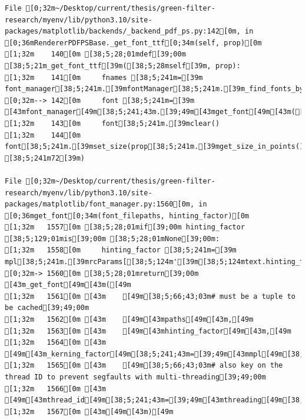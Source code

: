 \documentclass[
  letterpaper,
  DIV=11,
  numbers=noendperiod]{scrartcl}
\begin{document}
\begin{verbatim}
File [0;32m~/Desktop/current/thesis/green-filter-research/myenv/lib/python3.10/site-packages/matplotlib/backends/_backend_pdf_ps.py:142[0m, in [0;36mRendererPDFPSBase._get_font_ttf[0;34m(self, prop)[0m
[1;32m    140[0m [38;5;28;01mdef[39;00m [38;5;21m_get_font_ttf[39m([38;5;28mself[39m, prop):
[1;32m    141[0m     fnames [38;5;241m=[39m font_manager[38;5;241m.[39mfontManager[38;5;241m.[39m_find_fonts_by_props(prop)
[0;32m--> 142[0m     font [38;5;241m=[39m [43mfont_manager[49m[38;5;241;43m.[39;49m[43mget_font[49m[43m([49m[43mfnames[49m[43m)[49m
[1;32m    143[0m     font[38;5;241m.[39mclear()
[1;32m    144[0m     font[38;5;241m.[39mset_size(prop[38;5;241m.[39mget_size_in_points(), [38;5;241m72[39m)

File [0;32m~/Desktop/current/thesis/green-filter-research/myenv/lib/python3.10/site-packages/matplotlib/font_manager.py:1560[0m, in [0;36mget_font[0;34m(font_filepaths, hinting_factor)[0m
[1;32m   1557[0m [38;5;28;01mif[39;00m hinting_factor [38;5;129;01mis[39;00m [38;5;28;01mNone[39;00m:
[1;32m   1558[0m     hinting_factor [38;5;241m=[39m mpl[38;5;241m.[39mrcParams[[38;5;124m'[39m[38;5;124mtext.hinting_factor[39m[38;5;124m'[39m]
[0;32m-> 1560[0m [38;5;28;01mreturn[39;00m [43m_get_font[49m[43m([49m
[1;32m   1561[0m [43m    [49m[38;5;66;43;03m# must be a tuple to be cached[39;49;00m
[1;32m   1562[0m [43m    [49m[43mpaths[49m[43m,[49m
[1;32m   1563[0m [43m    [49m[43mhinting_factor[49m[43m,[49m
[1;32m   1564[0m [43m    [49m[43m_kerning_factor[49m[38;5;241;43m=[39;49m[43mmpl[49m[38;5;241;43m.[39;49m[43mrcParams[49m[43m[[49m[38;5;124;43m'[39;49m[38;5;124;43mtext.kerning_factor[39;49m[38;5;124;43m'[39;49m[43m][49m[43m,[49m
[1;32m   1565[0m [43m    [49m[38;5;66;43;03m# also key on the thread ID to prevent segfaults with multi-threading[39;49;00m
[1;32m   1566[0m [43m    [49m[43mthread_id[49m[38;5;241;43m=[39;49m[43mthreading[49m[38;5;241;43m.[39;49m[43mget_ident[49m[43m([49m[43m)[49m
[1;32m   1567[0m [43m[49m[43m)[49m


\end{verbatim}
\end{document}
